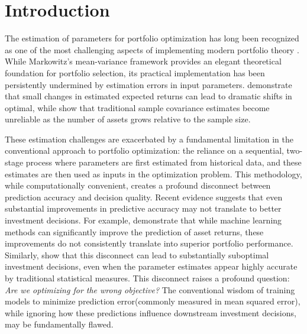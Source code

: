 \section{Introduction}
The estimation of parameters for portfolio optimization has long been recognized as one of the most challenging aspects of implementing modern portfolio theory \citep{michaud1989markowitz, demiguel2009optimal}. While Markowitz's mean-variance framework \citep{Markowitz1952} provides an elegant theoretical foundation for portfolio selection, its practical implementation has been persistently undermined by estimation errors in input parameters. \citep{chopra1993effect, chung2022effects} demonstrate that small changes in estimated expected returns can lead to dramatic shifts in optimal, while \citep{ledoit2003improved, ledoit2004well} show that traditional sample covariance estimates become unreliable as the number of assets grows relative to the sample size.

These estimation challenges are exacerbated by a fundamental limitation in the conventional approach to portfolio optimization: the reliance on a sequential, two-stage process where parameters are first estimated from historical data, and these estimates are then used as inputs in the optimization problem. This methodology, while computationally convenient, creates a profound disconnect between prediction accuracy and decision quality. Recent evidence suggests that even substantial improvements in predictive accuracy may not translate to better investment decisions. For example, \citep{gu2020empirical,cenesizoglu2012return} demonstrate that while machine learning methods can significantly improve the prediction of asset returns, these improvements do not consistently translate into superior portfolio performance. Similarly, \cite{elmachtoub2022smart} show that this disconnect can lead to substantially suboptimal investment decisions, even when the parameter estimates appear highly accurate by traditional statistical measures. This disconnect raises a profound question: \textit{Are we optimizing for the wrong objective?} The conventional wisdom of training models to minimize prediction error(commonly measured in mean squared error), while ignoring how these predictions influence downstream investment decisions, may be fundamentally flawed.

